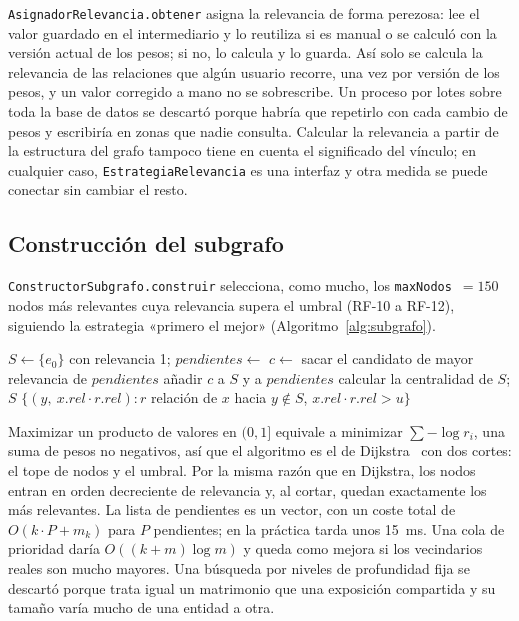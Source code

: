 
\texttt{AsignadorRelevancia.obtener} asigna la relevancia de forma perezosa: lee el valor guardado en el intermediario y lo reutiliza si es manual o se calculó con la versión actual de los pesos; si no, lo calcula y lo guarda. Así solo se calcula la relevancia de las relaciones que algún usuario recorre, una vez por versión de los pesos, y un valor corregido a mano no se sobrescribe. Un proceso por lotes sobre toda la base de datos se descartó porque habría que repetirlo con cada cambio de pesos y escribiría en zonas que nadie consulta. Calcular la relevancia a partir de la estructura del grafo tampoco tiene en cuenta el significado del vínculo; en cualquier caso, \texttt{EstrategiaRelevancia} es una interfaz y otra medida se puede conectar sin cambiar el resto.

\subsection{Construcción del subgrafo}
\label{sec:alg-subgrafo}

\texttt{ConstructorSubgrafo.construir} selecciona, como mucho, los \texttt{maxNodos}~$=150$ nodos más relevantes cuya relevancia supera el umbral (RF-10 a RF-12), siguiendo la estrategia «primero el mejor» (Algoritmo~\ref{alg:subgrafo}).

\begin{algorithm}[htbp]
  \caption{Construcción del subgrafo (\texttt{ConstructorSubgrafo.construir}).}
  \label{alg:subgrafo}
  \begin{algorithmic}[1]
      \State $S \gets \{e_0\}$ con relevancia 1; $pendientes \gets$ 
        \State $c \gets$ sacar el candidato de mayor relevancia de $pendientes$
          \State añadir $c$ a $S$ y  a $pendientes$
        \EndIf
      \EndWhile
      \State calcular la centralidad de $S$; \Return $S$
    \EndFunction
    \Statex
      \State \Return $\{(y,\ x.rel\cdot r.rel) : r$ relación de $x$ hacia $y \notin S$, $x.rel\cdot r.rel > u\}$
    \EndFunction
  \end{algorithmic}
\end{algorithm}

Maximizar un producto de valores en $(0,1]$ equivale a minimizar $\sum -\log r_i$, una suma de pesos no negativos, así que el algoritmo es el de Dijkstra~\cite{dijkstra1959} con dos cortes: el tope de nodos y el umbral. Por la misma razón que en Dijkstra, los nodos entran en orden decreciente de relevancia y, al cortar, quedan exactamente los más relevantes. La lista de pendientes es un vector, con un coste total de $O(k\cdot P + m_k)$ para $P$ pendientes; en la práctica tarda unos 15~ms. Una cola de prioridad daría $O((k+m)\log m)$ y queda como mejora si los vecindarios reales son mucho mayores. Una búsqueda por niveles de profundidad fija se descartó porque trata igual un matrimonio que una exposición compartida y su tamaño varía mucho de una entidad a otra.

